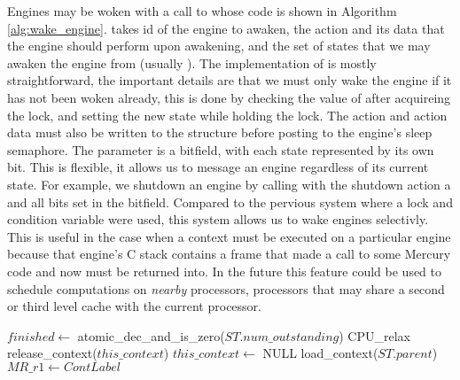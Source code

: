 Engines may be woken with a call to \wakeengine whose code is shown in
Algorithm \ref{alg:wake_engine}.
\wakeengine takes id of the engine to awaken,
the action and its data that the engine should perform upon awakening,
and the set of states that we may awaken the engine from (usually
).
The implementation of \wakeengine is mostly straightforward,
the important details are that we must only wake the engine if it has not
been woken already, this is done by checking the value of
 after acquireing the lock,
and setting the new state while holding the lock.
The action and action data must also be written to the
\enginesleepsync structure before posting to the engine's sleep
semaphore.
The parameter  is a bitfield, with each state represented by
its own bit.
This is flexible, it allows us to message an engine regardless of its
current state.
For example,
we shutdown an engine by calling \wakeengine with the shutdown action a and
all bits set in the  bitfield.
Compared to the pervious system where a lock and condition variable were
used,
this system allows us to wake engines selectivly.
This is useful in the case when a context must be executed on a particular
engine because that engine's C stack contains a frame that made a call to
some Mercury code and now must be returned into.
In the future this feature could be used to schedule computations on
\emph{nearby} processors,
processors that may share a second or third level cache with the current
processor.

\begin{algorithm}[tbp]
\begin{algorithmic}[1]
  \State $finished \gets$ atomic\_dec\_and\_is\_zero($ST.num\_outstanding$)
    \Else
        \State CPU\_relax
      \EndWhile
      \State release\_context($this\_context$)
      \State $this\_context \gets$ NULL
      \State load\_context($ST.parent$)
    \EndIf
  \Else
      \State $MR\_r1 \gets ContLabel$
    \Else
    \EndIf
  \EndIf
\EndProcedure
\end{algorithmic}
\caption{\joinandcontinue}
\label{alg:join_and_continue_ws2}
\end{algorithm}

